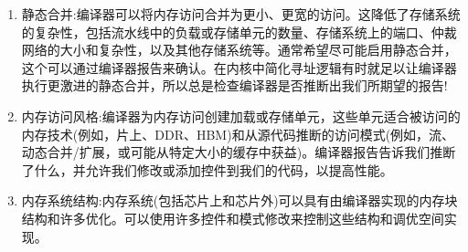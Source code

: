 \begin{enumerate}
	\item 静态合并:编译器可以将内存访问合并为更小、更宽的访问。这降低了存储系统的复杂性，包括流水线中的负载或存储单元的数量、存储系统上的端口、仲裁网络的大小和复杂性，以及其他存储系统等。通常希望尽可能启用静态合并，这个可以通过编译器报告来确认。在内核中简化寻址逻辑有时就足以让编译器执行更激进的静态合并，所以总是检查编译器是否推断出我们所期望的报告!
	\item 内存访问风格:编译器为内存访问创建加载或存储单元，这些单元适合被访问的内存技术(例如，片上、DDR、HBM)和从源代码推断的访问模式(例如，流、动态合并/扩展，或可能从特定大小的缓存中获益)。编译器报告告诉我们推断了什么，并允许我们修改或添加控件到我们的代码，以提高性能。
	\item 内存系统结构:内存系统(包括芯片上和芯片外)可以具有由编译器实现的内存块结构和许多优化。可以使用许多控件和模式修改来控制这些结构和调优空间实现。
\end{enumerate}
















